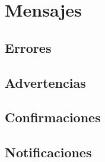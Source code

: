 \section{Mensajes}
\subsection{Errores}
\subsection{Advertencias}
\subsection{Confirmaciones}
\subsection{Notificaciones}